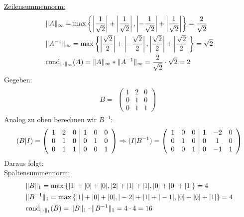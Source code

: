 \underline{Zeilensummennorm:}
\begin{align*}
\begin{split}
&\|A\|_\infty =\mathrm{max}\left\lbrace\left|\frac{1}{\sqrt2}\right|+\left|\frac{1}{\sqrt2}\right|, \left|-\frac{1}{\sqrt2}\right|+\left|\frac{1}{\sqrt2}\right|\right\rbrace=\frac{2}{\sqrt2}\\
&\|A^{-1}\|_\infty=\mathrm{max}\left\lbrace\left|\frac{\sqrt2}{2}\right|+\left|-\frac{\sqrt2}{2}\right|, \left|\frac{\sqrt2}{2}\right|+\left|\frac{\sqrt2}{2}\right|\right\rbrace={\sqrt2}\\
& \mathrm{cond}_{\| \cdot \|_\infty}(A)=\|A\|_\infty*\|A^{-1}\|_\infty=\frac{2}{\sqrt2} \cdot {\sqrt2} = 2\\
\end{split}
\end{align*}
\newline
Gegeben:\\
\begin{align*} 
B=
\begin{split}
\begin{pmatrix}
1 & 2 & 0 \\
0 & 1 & 0 \\
0 & 1 & 1
\end{pmatrix}
\end{split}
\end{align*}
Analog zu oben berechnen wir $B^{-1}$:\\
\begin{align*}
(B|I)=
\begin{split}
\begin{array}({ccc|ccc})
1 & 2 & 0 & 1 & 0 & 0\\
0 & 1 & 0 & 0 & 1 & 0\\
0 & 1 & 1 & 0 & 0 & 1
\end{array}
\Rightarrow(I|B^{-1})=
\begin{array}({ccc|ccc})
1 & 0 & 0 &1 & -2 & 0 \\
0 & 1 & 0 &0 & 1 & 0 \\
0 & 0 & 1 &0 & -1 & 1  
\end{array}
\end{split}
\end{align*}
Daraus folgt:\\
\underline{Spaltensummennorm:}
\begin{align*}
\begin{split}
&\|B\|_1=\mathrm{max} \left\lbrace|1|+|0|+|0|, |2|+|1|+|1|, |0|+|0|+|1|\right\rbrace = 4\\
&\|B^{-1}\|_1=\mathrm{max} \left\lbrace|1|+|0|+|0|, |-2|+|1|+|-1|, |0|+|0|+|1|\right\rbrace = 4\\
&\mathrm{cond}_{\| \cdot \|_1}(B)=\|B\|_1\cdot\|B^{-1}\|_1= 4 \cdot 4 = 16\\
\end{split}
\end{align*}
